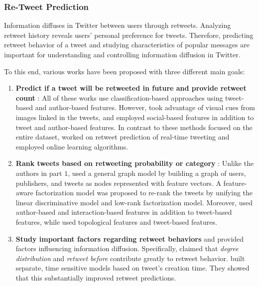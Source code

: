 \documentclass[11pt,a4paper]{article}
\begin{document}

\subsubsection{Re-Tweet Prediction} Information diffuses in Twitter between users through retweets. Analyzing retweet history reveals users’ personal preference for tweets. Therefore, predicting retweet behavior of a tweet and studying characteristics of popular messages are important for understanding and controlling information diffusion in Twitter. 

To this end, various works have been proposed with three different main goals:
\begin{enumerate}
\item \textbf{Predict if a tweet will be retweeted in future and provide retweet count} \cite{can, xu, petrovicOsborne}: All of these works use classification-based approaches using tweet-based and author-based features. However, \citet{can} took advantage of visual cues from images linked in the tweets, and \citet{xu} employed social-based features in addition to tweet and author-based features. In contrast to these methods focused on the entire dataset, \citet{petrovicOsborne} worked on retweet prediction of real-time tweeting and employed online learning algorithms. %
\item \textbf{Rank tweets based on retweeting probability or category} \cite{hong, feng}: Unlike the authors in part $1$, \citet{feng} used a general graph model by building a graph of users, publishers, and tweets as nodes represented with feature vectors. A feature-aware factorization model was proposed to re-rank the tweets by unifying the linear discriminative model and low-rank factorization model. Moreover, \cite{feng} used author-based and interaction-based features in addition to tweet-based features, while \citet{hong} used topological features and tweet-based features.
\item \textbf{Study important factors regarding retweet behaviors} \citet{hong} and \citet{petrovicOsborne} provided factors influencing information diffusion. Specifically, \citeauthor{hong} claimed that \textit{degree distribution} and \textit{retweet before} contribute greatly to retweet behavior. \citeauthor{petrovicOsborne} built separate, time sensitive models based on tweet's creation time. They showed that this substantially improved retweet predictions.%
\end{enumerate}
\end{document}
